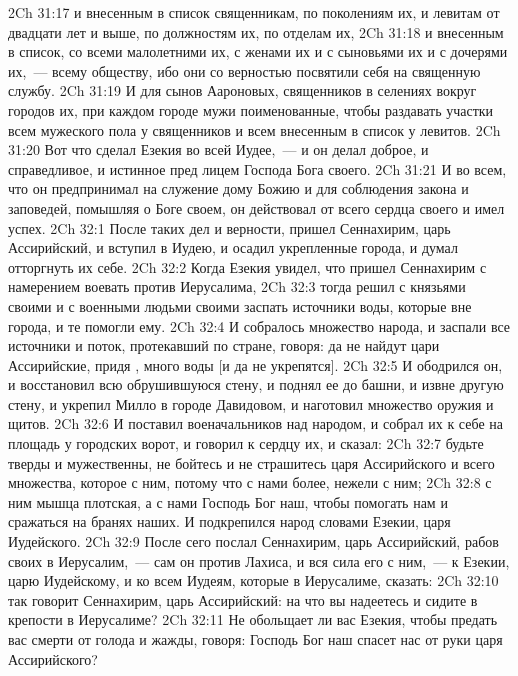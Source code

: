 \vs 2Ch 31:17 и внесенным в список священникам, по поколениям их, и левитам от двадцати лет и выше, по должностям их, по отделам их,
\vs 2Ch 31:18 и внесенным в список, со всеми малолетними их, с женами их и с сыновьями их и с дочерями их,~--- всему обществу, ибо они со  верностью посвятили себя на священную службу.
\vs 2Ch 31:19 И для сынов Аароновых, священников в селениях вокруг городов их, при каждом городе  мужи поименованные, чтобы раздавать участки всем мужеского пола у священников и всем внесенным в список у левитов.
\rsbpar\vs 2Ch 31:20 Вот что сделал Езекия во всей Иудее,~--- и он делал доброе, и справедливое, и истинное пред лицем Господа Бога своего.
\vs 2Ch 31:21 И во всем, что он предпринимал на служение дому Божию и для соблюдения закона и заповедей, помышляя о Боге своем, он действовал от всего сердца своего и имел успех.
\vs 2Ch 32:1 После таких дел и верности, пришел Сеннахирим, царь Ассирийский, и вступил в Иудею, и осадил укрепленные города, и думал отторгнуть их себе.
\vs 2Ch 32:2 Когда Езекия увидел, что пришел Сеннахирим с намерением воевать против Иерусалима,
\vs 2Ch 32:3 тогда решил с князьями своими и с военными людьми своими заспать источники воды, которые вне города, и те помогли ему.
\vs 2Ch 32:4 И собралось множество народа, и заспали все источники и поток, протекавший по стране, говоря: да не найдут цари Ассирийские, придя , много воды [и да не укрепятся].
\vs 2Ch 32:5 И ободрился он, и восстановил всю обрушившуюся стену, и поднял ее до башни, и извне  другую стену, и укрепил Милло в городе Давидовом, и наготовил множество оружия и щитов.
\vs 2Ch 32:6 И поставил военачальников над народом, и собрал их к себе на площадь у городских ворот, и говорил к сердцу их, и сказал:
\vs 2Ch 32:7 будьте тверды и мужественны, не бойтесь и не страшитесь царя Ассирийского и всего множества, которое с ним, потому что с нами более, нежели с ним;
\vs 2Ch 32:8 с ним мышца плотская, а с нами Господь Бог наш, чтобы помогать нам и сражаться на бранях наших. И подкрепился народ словами Езекии, царя Иудейского.
\rsbpar\vs 2Ch 32:9 После сего послал Сеннахирим, царь Ассирийский, рабов своих в Иерусалим,~--- сам он  против Лахиса, и вся сила его с ним,~--- к Езекии, царю Иудейскому, и ко всем Иудеям, которые в Иерусалиме, сказать:
\vs 2Ch 32:10 так говорит Сеннахирим, царь Ассирийский: на что вы надеетесь и сидите в крепости в Иерусалиме?
\vs 2Ch 32:11 Не обольщает ли вас Езекия, чтобы предать вас смерти от голода и жажды, говоря: Господь Бог наш спасет нас от руки царя Ассирийского?
